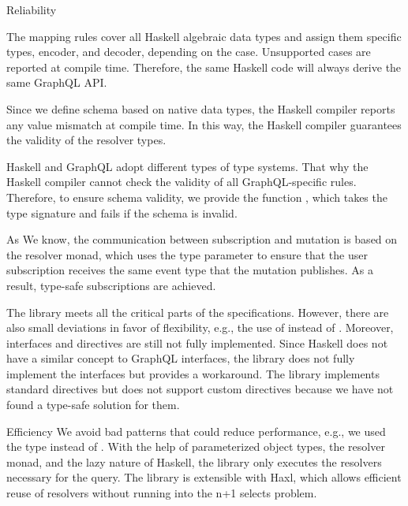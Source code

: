 \begin{frame}
\begin{block}{Reliability}
\begin{itemize}
\begin{enumerate}
       The mapping rules cover all Haskell algebraic data types and assign them specific types, encoder, and decoder, depending on the case. Unsupported cases are reported at compile time. Therefore, the same Haskell code will always derive the same GraphQL API. 

       Since we define schema based on native data types, the Haskell compiler reports any value mismatch at compile time. In this way, the Haskell compiler guarantees the validity of the resolver types.
      
       Haskell and GraphQL adopt different types of type systems. That why the Haskell compiler cannot check the validity of all GraphQL-specific rules. Therefore, to ensure schema validity, we provide the function , which takes the  type signature and fails if the schema is invalid.
    
       As We know, the communication between subscription and mutation is based on the resolver monad, which uses the type parameter  to ensure that the user subscription receives the same event type that the mutation publishes.   As a result, type-safe subscriptions are achieved.

    \end{enumerate}

   The library meets all the critical parts of the specifications. However, there are also small deviations in favor of flexibility, e.g., the use of  instead of . Moreover, interfaces and directives are still not fully implemented. Since Haskell does not have a similar concept to GraphQL interfaces, the library does not fully implement the interfaces but provides a workaround. The library implements standard directives but does not support custom directives because we have not found a type-safe solution for them.

\end{itemize}

\end{block}

\begin{block}{Efficiency} We avoid bad patterns that could reduce performance, e.g., we used the type  instead of . 
With the help of parameterized object types, the resolver monad, and the lazy nature of Haskell, the library only executes the resolvers necessary for the query. The library is extensible with Haxl, which allows efficient reuse of resolvers without running into the n+1 selects problem.

\end{block}

\end{frame}

